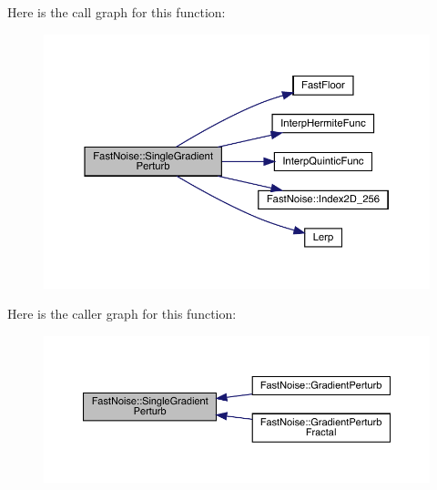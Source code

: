 Here is the call graph for this function\+:
\nopagebreak
\begin{figure}[H]
\begin{center}
\leavevmode
\includegraphics[width=350pt]{class_fast_noise_a10f8238bf167c02937ad19c0f081549a_cgraph}
\end{center}
\end{figure}
Here is the caller graph for this function\+:
\nopagebreak
\begin{figure}[H]
\begin{center}
\leavevmode
\includegraphics[width=350pt]{class_fast_noise_a10f8238bf167c02937ad19c0f081549a_icgraph}
\end{center}
\end{figure}
\mbox{\label{class_fast_noise_ac584dcaa35fdc6d8af986eba0d3ed50e}} 
